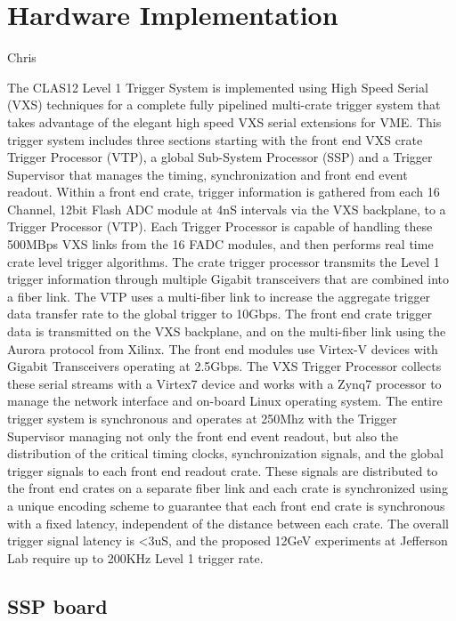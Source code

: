 \section{Hardware Implementation} Chris

The CLAS12 Level 1 Trigger System is implemented using High Speed Serial (VXS) techniques for a complete fully pipelined multi-crate trigger system that takes advantage of the elegant high speed VXS serial extensions for VME.  This trigger system includes three sections starting with the front end VXS crate Trigger Processor (VTP), a global Sub-System Processor (SSP) and a Trigger Supervisor that manages the timing, synchronization and front end event readout.  
Within a front end crate, trigger information is gathered from each 16 Channel, 12bit Flash ADC module at 4nS intervals via the VXS backplane, to a Trigger Processor (VTP).  Each Trigger Processor is capable of handling these 500MBps VXS links from the 16 FADC modules, and then performs real time crate level trigger algorithms.  The crate trigger processor transmits the Level 1 trigger information through multiple Gigabit transceivers that are combined into a fiber link.  The VTP uses a multi-fiber link to increase the aggregate trigger data transfer rate to the global trigger to 10Gbps.
The front end crate trigger data is transmitted on the VXS backplane, and on the multi-fiber link using the Aurora protocol from Xilinx.  The front end modules use Virtex-V devices with Gigabit Transceivers operating at 2.5Gbps. The VXS Trigger Processor collects these serial streams with a Virtex7 device and works with a Zynq7 processor to manage the network interface and on-board Linux operating system.
The entire trigger system is synchronous and operates at 250Mhz with the Trigger Supervisor managing not only the front end event readout, but also the distribution of the critical timing clocks, synchronization signals, and the global trigger signals to each front end readout crate.  These signals are distributed to the front end crates on a separate fiber link and each crate is synchronized using a unique encoding scheme to guarantee that each front end crate is synchronous with a fixed latency, independent of the distance between each crate.  The overall trigger signal latency is <3uS, and the proposed 12GeV experiments at Jefferson Lab require up to 200KHz Level 1 trigger rate.

\subsection{SSP board}

